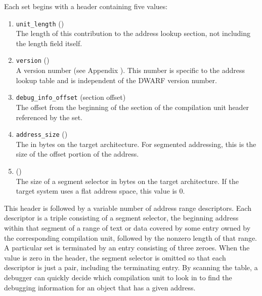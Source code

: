Each set begins with a header containing five values:
\begin{enumerate}[1. ]
\item \texttt{unit\_length} () \\
The length of this contribution to the address lookup section,
not including the length field itself.

\item \texttt{version} (\HFTuhalf) \\
A version number 
(see Appendix ). 
This number is specific to the address lookup table and is
independent of the DWARF version number.

\item \texttt{debug\_info\_offset} (section offset) \\
The offset from the
beginning of the \dotdebuginfo{} section of the
compilation unit header referenced by the set.

\item \texttt{address\_size} (\HFTubyte) \\
The 
in bytes on
the target architecture. For 
segmented addressing, this is
the size of the offset portion of the address.

\item \HFNsegmentselectorsize{} (\HFTubyte) \\
The size of a segment selector in
bytes on the target architecture. If the target system uses
a flat address space, this value is 0.

\end{enumerate}

This header is followed by a variable number of address range
descriptors. Each descriptor is a triple consisting of a
segment selector, the beginning address within that segment
of a range of text or data covered by some entry owned by
the corresponding compilation unit, followed by the non\dash zero
length of that range. A particular set is terminated by an
entry consisting of three zeroes. 
When the \HFNsegmentselectorsize{} value
is zero in the header, the segment selector is omitted so that
each descriptor is just a pair, including the terminating
entry. By scanning the table, a debugger can quickly decide
which compilation unit to look in to find the debugging
information for an object that has a given address.

